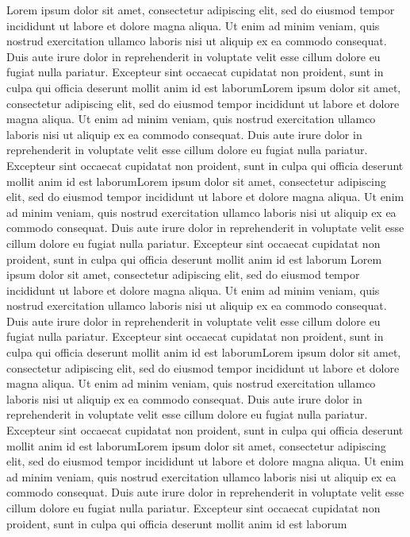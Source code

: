 \documentclass[reprint,superscriptaddress,floatfix]{revtex4-2}
\begin{document}
Lorem ipsum dolor sit amet, consectetur adipiscing elit, sed do eiusmod tempor incididunt ut labore et dolore magna aliqua. Ut enim ad minim veniam, quis nostrud exercitation ullamco laboris nisi ut aliquip ex ea commodo consequat. Duis aute irure dolor in reprehenderit in voluptate velit esse cillum dolore eu fugiat nulla pariatur. Excepteur sint occaecat cupidatat non proident, sunt in culpa qui officia deserunt mollit anim id est laborumLorem ipsum dolor sit amet, consectetur adipiscing elit, sed do eiusmod tempor incididunt ut labore et dolore magna aliqua. Ut enim ad minim veniam, quis nostrud exercitation ullamco laboris nisi ut aliquip ex ea commodo consequat. Duis aute irure dolor in reprehenderit in voluptate velit esse cillum dolore eu fugiat nulla pariatur. Excepteur sint occaecat cupidatat non proident, sunt in culpa qui officia deserunt mollit anim id est laborumLorem ipsum dolor sit amet, consectetur adipiscing elit, sed do eiusmod tempor incididunt ut labore et dolore magna aliqua. Ut enim ad minim veniam, quis nostrud exercitation ullamco laboris nisi ut aliquip ex ea commodo consequat. Duis aute irure dolor in reprehenderit in voluptate velit esse cillum dolore eu fugiat nulla pariatur. Excepteur sint occaecat cupidatat non proident, sunt in culpa qui officia deserunt mollit anim id est laborum
Lorem ipsum dolor sit amet, consectetur adipiscing elit, sed do eiusmod tempor incididunt ut labore et dolore magna aliqua. Ut enim ad minim veniam, quis nostrud exercitation ullamco laboris nisi ut aliquip ex ea commodo consequat. Duis aute irure dolor in reprehenderit in voluptate velit esse cillum dolore eu fugiat nulla pariatur. Excepteur sint occaecat cupidatat non proident, sunt in culpa qui officia deserunt mollit anim id est laborumLorem ipsum dolor sit amet, consectetur adipiscing elit, sed do eiusmod tempor incididunt ut labore et dolore magna aliqua. Ut enim ad minim veniam, quis nostrud exercitation ullamco laboris nisi ut aliquip ex ea commodo consequat. Duis aute irure dolor in reprehenderit in voluptate velit esse cillum dolore eu fugiat nulla pariatur. Excepteur sint occaecat cupidatat non proident, sunt in culpa qui officia deserunt mollit anim id est laborumLorem ipsum dolor sit amet, consectetur adipiscing elit, sed do eiusmod tempor incididunt ut labore et dolore magna aliqua. Ut enim ad minim veniam, quis nostrud exercitation ullamco laboris nisi ut aliquip ex ea commodo consequat. Duis aute irure dolor in reprehenderit in voluptate velit esse cillum dolore eu fugiat nulla pariatur. Excepteur sint occaecat cupidatat non proident, sunt in culpa qui officia deserunt mollit anim id est laborum
\end{document}
